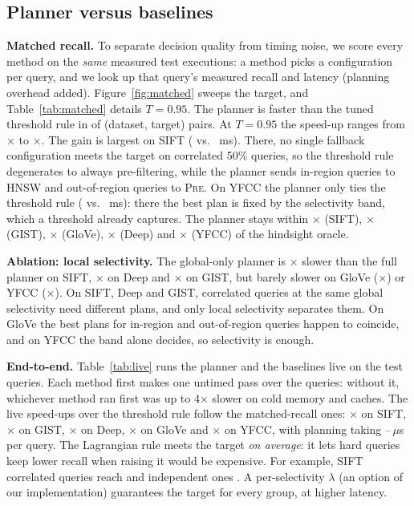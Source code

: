 \documentclass[sigconf,nonacm]{acmart}
\newcommand{\pre}{\textsc{Pre}\xspace}
\begin{document}
\subsection{Planner versus baselines}
\textbf{Matched recall.} To separate decision quality from timing noise, we score every method on the \emph{same} measured test executions: a method picks a configuration per query, and we look up that query's measured recall and latency (planning overhead added). Figure~\ref{fig:matched} sweeps the target, and Table~\ref{tab:matched} details $T=0.95$. The planner is faster than the tuned threshold rule in \mrWins{} of \mrCells{} (dataset, target) pairs. At $T=0.95$ the speed-up ranges from \mrSpeedupMin$\times$ to \mrSpeedupMax$\times$. The gain is largest on SIFT (\mrSiftPlannerMs{} vs.\ \mrSiftThresholdMs{} ms). There, no single fallback configuration meets the target on correlated 50\% queries, so the threshold rule degenerates to always pre-filtering, while the planner sends in-region queries to HNSW and out-of-region queries to \pre. On YFCC the planner only ties the threshold rule (\mrYfccPlannerMs{} vs.\ \mrYfccThresholdMs{} ms): there the best plan is fixed by the selectivity band, which a threshold already captures. The planner stays within \mrSiftOracleGap$\times$ (SIFT), \mrGistOracleGap$\times$ (GIST), \mrGloveOracleGap$\times$ (GloVe), \mrDeepOracleGap$\times$ (Deep) and \mrYfccOracleGap$\times$ (YFCC) of the hindsight oracle.

\textbf{Ablation: local selectivity.} The global-only planner is \mrSiftGlobalSlowdown$\times$ slower than the full planner on SIFT, \mrDeepGlobalSlowdown$\times$ on Deep and \mrGistGlobalSlowdown$\times$ on GIST, but barely slower on GloVe (\mrGloveGlobalSlowdown$\times$) or YFCC (\mrYfccGlobalSlowdown$\times$). On SIFT, Deep and GIST, correlated queries at the same global selectivity need different plans, and only local selectivity separates them. On GloVe the best plans for in-region and out-of-region queries happen to coincide, and on YFCC the band alone decides, so selectivity is enough.

\textbf{End-to-end.} Table~\ref{tab:live} runs the planner and the baselines live on the test queries. Each method first makes one untimed pass over the queries: without it, whichever method ran first was up to 4$\times$ slower on cold memory and caches. The live speed-ups over the threshold rule follow the matched-recall ones: \liveSiftSpeedup$\times$ on SIFT, \liveGistSpeedup$\times$ on GIST, \liveDeepSpeedup$\times$ on Deep, \liveGloveSpeedup$\times$ on GloVe and \liveYfccSpeedup$\times$ on YFCC, with planning taking \liveDeepOverheadUs--\liveGistOverheadUs\,$\mu$s per query. The Lagrangian rule meets the target \emph{on average}: it lets hard queries keep lower recall when raising it would be expensive. For example, SIFT correlated queries reach \liveSiftPlannerCorrelatedRec{} and independent ones \liveSiftPlannerIndependentRec. A per-selectivity $\lambda$ (an option of our implementation) guarantees the target for every group, at higher latency.
\end{document}
